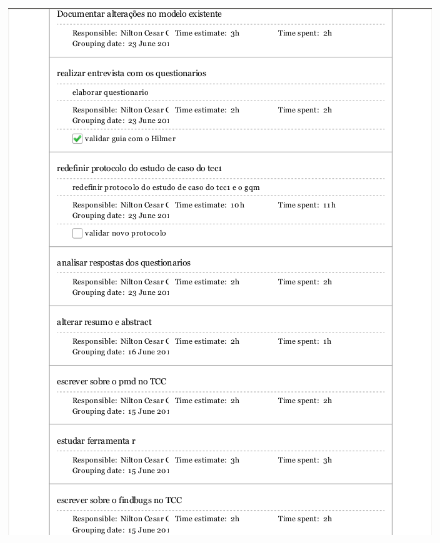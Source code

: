 \begin{apendicesenv}
\begin{figure}[h!]
\centering
\includegraphics[keepaspectratio=false,scale=0.70]{figuras/figuras_nilton/kanban2.png}
\end{figure}


\end{apendicesenv}
